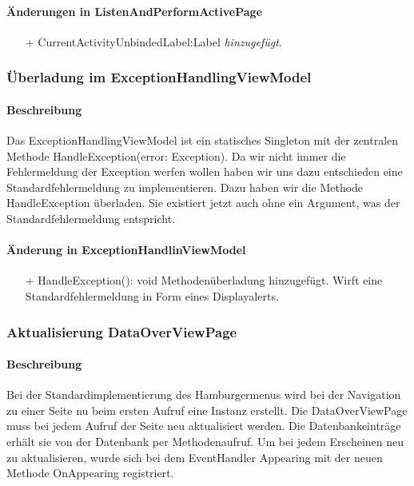 \documentclass[a4paper,12pt]{article}
\begin{document}
\paragraph{Änderungen in ListenAndPerformActivePage}
\begin{itemize}
	\item[+] CurrentActivityUnbindedLabel:Label \textit{hinzugefügt}.
\end{itemize}

\subsubsection{Überladung im ExceptionHandlingViewModel}
\paragraph{Beschreibung}
Das ExceptionHandlingViewModel ist ein statisches Singleton mit der zentralen Methode HandleException(error: Exception). Da wir nicht immer die Fehlermeldung der Exception werfen wollen haben wir uns dazu entschieden eine Standardfehlermeldung zu implementieren. Dazu haben wir die Methode HandleException überladen. Sie existiert jetzt auch ohne ein Argument, was der Standardfehlermeldung entspricht.
\paragraph{Änderung in ExceptionHandlinViewModel}
\begin{itemize}
	\item[+] HandleException(): void  Methodenüberladung hinzugefügt. Wirft eine Standardfehlermeldung in Form eines Displayalerts.
\end{itemize}

\subsubsection{Aktualisierung DataOverViewPage}
\paragraph{Beschreibung}
Bei der Standardimplementierung des Hamburgermenus wird bei der Navigation zu einer Seite nu beim ersten Aufruf eine Instanz erstellt. Die DataOverViewPage muss bei jedem Aufruf der Seite neu aktualisiert werden. Die Datenbankeinträge erhält sie von der Datenbank per Methodenaufruf. Um bei jedem Erscheinen neu zu aktualisieren, wurde sich bei dem EventHandler Appearing mit der neuen Methode OnAppearing registriert.
\end{document}
